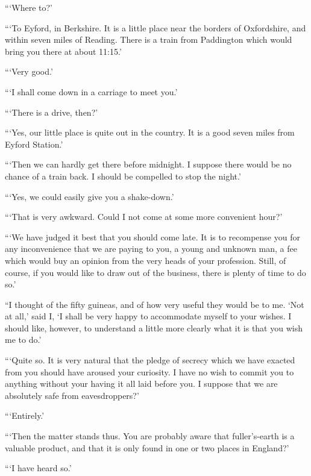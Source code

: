 \documentclass{article}
\begin{document}
```Where to?'

```To Eyford, in Berkshire. It is a little place near the borders of
Oxfordshire, and within seven miles of Reading. There is a train from
Paddington which would bring you there at about 11:15.'

```Very good.'

```I shall come down in a carriage to meet you.'

```There is a drive, then?'

```Yes, our little place is quite out in the country. It is a good seven
miles from Eyford Station.'

```Then we can hardly get there before midnight. I suppose there would
be no chance of a train back. I should be compelled to stop the night.'

```Yes, we could easily give you a shake-down.'

```That is very awkward. Could I not come at some more convenient hour?'

```We have judged it best that you should come late. It is to recompense
you for any inconvenience that we are paying to you, a young and
unknown man, a fee which would buy an opinion from the very heads of
your profession. Still, of course, if you would like to draw out of the
business, there is plenty of time to do so.'

``I thought of the fifty guineas, and of how very useful they would
be to me. `Not at all,' said I, `I shall be very happy to accommodate
myself to your wishes. I should like, however, to understand a little
more clearly what it is that you wish me to do.'

```Quite so. It is very natural that the pledge of secrecy which we have
exacted from you should have aroused your curiosity. I have no wish to
commit you to anything without your having it all laid before you. I
suppose that we are absolutely safe from eavesdroppers?'

```Entirely.'

```Then the matter stands thus. You are probably aware that fuller's-earth
is a valuable product, and that it is only found in one or two places
in England?'

```I have heard so.'
\end{document}
